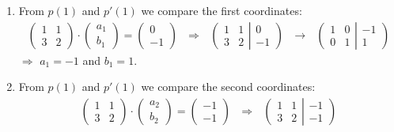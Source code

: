 \documentclass{article}
\begin{document}
        \begin{enumerate}
            \item From $p(1)$ and $p'(1)$ we compare the first coordinates:
                \begin{align}
                    \left(\begin{matrix} 1&1\\3&2 \end{matrix}\right) \cdot \left(\begin{matrix} a_1\\b_1 \end{matrix}\right) = \left(\begin{matrix} 0\\-1 \end{matrix}\right)
                    \ \ \ \Rightarrow\ \ \  \left(\begin{array}{cc} 1&1\\3&2 \end{array} \right | \left. \begin{array}{c} 0\\-1 \end{array}\right)
                    \ \ \ \rightarrow\ \ \  \left(\begin{array}{cc} 1&0\\0&1 \end{array} \right | \left. \begin{array}{c} -1\\1 \end{array}\right)
                \end{align}
                $\Rightarrow$ $a_1 = -1$ and $b_1 = 1$.
            \item From $p(1)$ and $p'(1)$ we compare the second coordinates:
                \begin{align}
                    \left(\begin{matrix} 1&1\\3&2 \end{matrix}\right) \cdot \left(\begin{matrix} a_2\\b_2 \end{matrix}\right) = \left(\begin{matrix} -1\\-1 \end{matrix}\right)
                    \ \ \ \Rightarrow\ \ \  \left(\begin{array}{cc} 1&1\\3&2 \end{array} \right | \left. \begin{array}{c} -1\\-1 \end{array}\right)

\end{align}
\end{enumerate}
\end{document}
